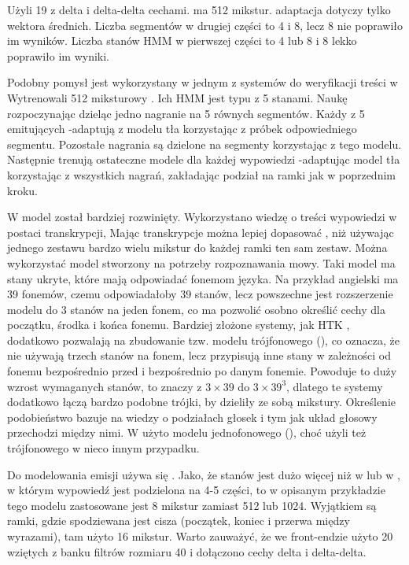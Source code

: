 Użyli 19  z delta i delta-delta cechami.  ma 512 mikstur.  adaptacja
dotyczy tylko wektora średnich. Liczba segmentów w drugiej części to 4 i 8, lecz 8 nie poprawiło im wyników. Liczba
stanów HMM w pierwszej części to 4 lub 8 i 8 lekko poprawiło im wyniki.

Podobny pomysł jest wykorzystany w jednym z systemów do weryfikacji treści w \cite{utteranceVerificationFor}
Wytrenowali 512 miksturowy . Ich HMM jest typu  z 5 stanami.
Naukę rozpoczynając dzieląc jedno nagranie na 5 równych segmentów.
Każdy z 5  emitujących -adaptują z modelu tła korzystając z próbek odpowiedniego segmentu.
Pozostałe nagrania są dzielone na segmenty korzystając z tego modelu. Następnie trenują ostateczne modele dla każdej
wypowiedzi -adaptując model tła korzystając z wszystkich nagrań, zakładając podział na ramki jak
w poprzednim kroku.

W \cite{comparisonOfMultiple}
model  został bardziej rozwinięty. Wykorzystano wiedzę o treści wypowiedzi w postaci transkrypcji,
Mając transkrypcje można lepiej dopasować , niż używając jednego zestawu bardzo wielu mikstur
do każdej ramki ten sam zestaw.
Można wykorzystać model stworzony na potrzeby rozpoznawania mowy.
Taki model ma stany ukryte, które mają odpowiadać fonemom języka. Na przykład angielski ma 39
fonemów, czemu odpowiadałoby 39 stanów, lecz powszechne jest rozszerzenie
modelu do 3 stanów na jeden fonem, co ma pozwolić osobno określić cechy dla początku, środka i końca fonemu.
Bardziej złożone systemy, jak HTK\cite{theHtkBook}
, dodatkowo pozwalają na zbudowanie tzw. modelu trójfonowego (), co oznacza,
że nie używają trzech stanów na fonem, lecz
przypisują inne stany w zależności od fonemu bezpośrednio przed i bezpośrednio po danym fonemie.
Powoduje to duży wzrost wymaganych stanów, to znaczy z $3 \times 39$ do $3 \times 39^3$,
dlatego te systemy dodatkowo łączą bardzo podobne trójki, by dzieliły ze sobą mikstury.
Określenie podobieństwo bazuje na wiedzy o podziałach głosek i tym jak układ głosowy przechodzi między nimi.
W \cite{comparisonOfMultiple}
użyto modelu jednofonowego (), choć użyli też trójfonowego w nieco innym przypadku.

Do modelowania emisji używa się . Jako, że stanów jest dużo więcej niż w 
lub w , w którym wypowiedź jest podzielona na 4-5 części, to
w opisanym przykładzie tego modelu zastosowane jest 8 mikstur zamiast 512 lub 1024. Wyjątkiem są ramki,
gdzie spodziewana jest cisza (początek, koniec i przerwa między wyrazami), tam
użyto 16 mikstur. Warto zauważyć, że we front-endzie użyto 20  wziętych z banku filtrów rozmiaru
40 i dołączono cechy delta i delta-delta.

